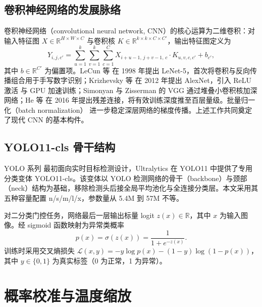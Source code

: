 \documentclass[UTF8,openany,12pt]{ctexbook}
\begin{document}
\subsection{卷积神经网络的发展脉络}
卷积神经网络（convolutional neural network, CNN）的核心运算为二维卷积：对输入特征图 $X \in \mathbb{R}^{H \times W \times C}$ 与卷积核 $K \in \mathbb{R}^{k \times k \times C \times C'}$，输出特征图定义为
\begin{equation}
Y_{i,j,c'} = \sum_{u=1}^{k}\sum_{v=1}^{k}\sum_{c=1}^{C} X_{i+u-1,\,j+v-1,\,c}\cdot K_{u,v,c,c'} + b_{c'},
\label{eq:conv}
\end{equation}
其中 $b \in \mathbb{R}^{C'}$ 为偏置项。LeCun 等\cite{lecun1998gradient} 在 1998 年提出 LeNet-5，首次将卷积与反向传播组合用于手写数字识别；Krizhevsky 等\cite{krizhevsky2012imagenet} 在 2012 年提出 AlexNet，引入 ReLU 激活\cite{nair2010relu} 与 GPU 加速训练；Simonyan 与 Zisserman\cite{simonyan2015vgg} 的 VGG 通过堆叠小卷积核加深网络；He 等\cite{he2016resnet} 在 2016 年提出残差连接，将有效训练深度推至百层量级。批量归一化（batch normalization）\cite{ioffe2015batchnorm} 进一步稳定深层网络的梯度传播。上述工作共同奠定了现代 CNN 的基本构件。

\subsection{YOLO11-cls 骨干结构}
YOLO 系列\cite{redmon2016yolo,redmon2017yolov2,redmon2018yolov3,bochkovskiy2020yolov4} 最初面向实时目标检测设计，Ultralytics 在 YOLO11\cite{jocher2023ultralytics} 中提供了专用分类变体 YOLO11-cls。该变体以 YOLO 检测网络的骨干（backbone）与颈部（neck）结构为基础，移除检测头后接全局平均池化与全连接分类层。本文采用其五种容量配置 n/s/m/l/x，参数量从 5.4M 到 57M 不等。

对二分类门控任务，网络最后一层输出标量 logit $z(x) \in \mathbb{R}$，其中 $x$ 为输入图像。经 sigmoid 函数映射为异常类概率
\begin{equation}
p(x) = \sigma(z(x)) = \frac{1}{1 + e^{-z(x)}}.
\label{eq:sigmoid}
\end{equation}
训练时采用交叉熵损失 $\mathcal{L}(x,y) = -y\log p(x) - (1-y)\log(1-p(x))$，其中 $y \in \{0,1\}$ 为真实标签（0 为正常，1 为异常）。

\section{概率校准与温度缩放}
\end{document}
